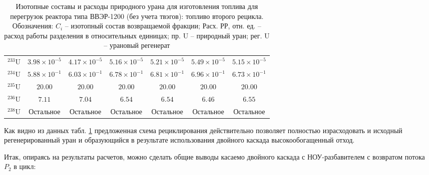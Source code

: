 \begin{table}
\begin{tabular}{|c|c|c|c|c|c|c|}
    ${ }^{233} \mathrm{U}$ & $3.98 \times 10^{-5}$ & $4.17 \times 10^{-5}$ & $5.16 \times 10^{-5}$ & $5.21 \times 10^{-5}$ & $5.49 \times 10^{-5}$ & $5.15 \times 10^{-5}$ \\
    ${ }^{234} \mathrm{U}$ & $5.88 \times 10^{-1}$ & $6.03 \times 10^{-1}$ & $6.78 \times 10^{-1}$ & $6.81 \times 10^{-1}$ & $6.96 \times 10^{-1}$ & $6.73 \times 10^{-1}$ \\
    ${ }^{235} \mathrm{U}$ & $20.00$ & $20.00$ & $20.00$ & $20.00$ & $20.00$ & $20.00$ \\
    ${ }^{236} \mathrm{U}$ & $7.11$ & $7.04$ & $6.54$ & $6.54$ & $6.46$ & $6.55$ \\
    ${ }^{238} \mathrm{U}$ & Остальное & Остальное & Остальное & Остальное & Остальное & Остальное \\
    \hline
    \end{tabular}
    \caption{Изотопные составы и расходы природного урана для изготовления топлива для перегрузок реактора
    типа ВВЭР-1200 (без учета твэгов): топливо второго рецикла. Обозначения: $C_i$ -- изотопный состав возвращаемой фракции; Расх. РР, отн. ед. -- расход работы разделения в относительных единицах; пр. U -- природный уран; рег. U -- урановый регенерат}\label{vest2019_2}
\end{table}


Как видно из данных табл. \ref{vest2019_2} предложенная схема рециклирования действительно позволяет полностью израсходовать и исходный регенерированный уран и образующийся в результате использования двойного каскада высокообогащенный отход.

Итак, опираясь на результаты расчетов, можно сделать общие выводы касаемо двойного каскада с НОУ-разбавителем с возвратом потока $P_2$ в цикл:

